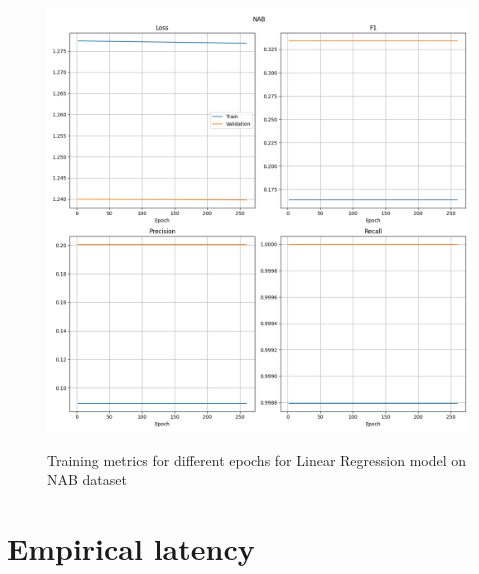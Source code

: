 \documentclass[a4paper, twoside]{report}
\theoremstyle{definition}
\numberwithin{equation}{section}
\begin{document}
\begin{figure}[h!]
    \centering
    \caption{Training metrics for different epochs for Linear Regression model on NAB dataset}
    \includegraphics[width=\textwidth]{plots/LinearRegression_NAB.png}
    \label{fig:LinearRegression_NAB_training}
\end{figure}

\chapter{Empirical latency} \label{app:empirical_latency}
\end{document}
